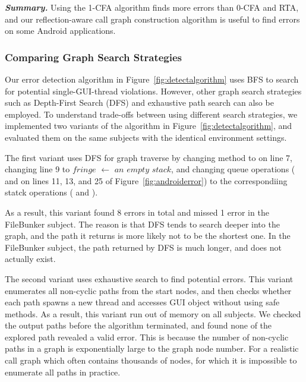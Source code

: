 \vspace{1mm}

\noindent \textbf{\textit{Summary.}} Using the 1-CFA 
algorithm finds more errors than 0-CFA and RTA, and our reflection-aware call
graph construction algorithm is useful to find errors on some
Android applications.

\subsubsection{Comparing Graph Search Strategies}
\label{sec:search}

Our error detection algorithm in Figure~\ref{fig:detectalgorithm} uses BFS to search for
potential single-GUI-thread violations. However, other graph search strategies such as
Depth-First Search (DFS) and exhaustive path search can also be employed. To
understand trade-offs between using different search strategies, we 
implemented two variants of the algorithm in Figure~\ref{fig:detectalgorithm}, and
evaluated them on the same subjects with the identical environment settings.

The first variant uses DFS for graph traverse by changing method 
to  on line 7, changing line 9 to
$\mathit{fringe}$ $\leftarrow$ $\mathit{an}$ $\mathit{empty}$ $\mathit{stack}$,
and changing queue operations ( and  on lines 11, 13, and 25 of Figure~\ref{fig:androiderror})
to the correspondiing statck operations ( and ).

As a result, this variant found 8 errors in total and missed 1 error in the FileBunker subject.
The reason is that DFS tends to search deeper into the graph, and the path it returns
is more likely not to be the shortest one. In the FileBunker subject, the path
returned by DFS is much longer, and does not actually exist.


The second variant uses exhaustive search to find potential errors. This variant
enumerates all non-cyclic paths from the start nodes, and then checks whether each
path spawns a new thread and accesses GUI object without using safe methods. As
a result, this variant run out of memory on all subjects. We checked
the output paths before the algorithm terminated, and found none of the explored
path revealed a valid error. This is because the number of
non-cyclic paths in a graph is exponentially large to the graph node number.
For a realistic call graph which often contains thousands of nodes, for which
it is impossible to enumerate all paths in practice. 



